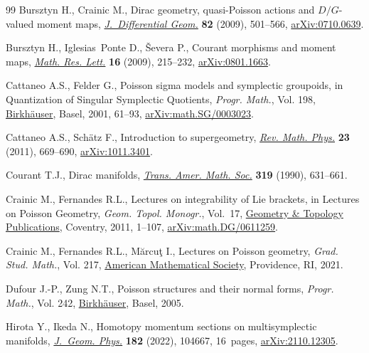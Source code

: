 \documentclass[10pt,a4paper]{amsart}
\numberwithin{equation}{section}
\begin{document}
\begin{thebibliography}{99}
Bursztyn H., Crainic M., Dirac geometry, quasi-{P}oisson actions and
 {$D/G$}-valued moment maps, \href{https://doi.org/10.4310/jdg/1251122545}{\textit{J.~Differential Geom.}} \textbf{82}
 (2009), 501--566, \href{https://arxiv.org/abs/0710.0639}{arXiv:0710.0639}.

Bursztyn H., Iglesias~Ponte D., \v{S}evera P., Courant morphisms and moment
 maps, \href{https://doi.org/10.4310/MRL.2009.v16.n2.a2}{\textit{Math. Res. Lett.}} \textbf{16} (2009), 215--232,
 \href{https://arxiv.org/abs/0801.1663}{arXiv:0801.1663}.

Cattaneo A.S., Felder G., Poisson sigma models and symplectic groupoids, in
 Quantization of {S}ingular {S}ymplectic {Q}uotients, \textit{Progr. Math.},
 Vol. 198, \href{https://doi.org/10.1007/978-3-0348-8364-1_4}{Birkh\"auser}, Basel, 2001, 61--93, \href{https://arxiv.org/abs/math.SG/0003023}{arXiv:math.SG/0003023}.

Cattaneo A.S., Sch\"atz F., Introduction to supergeometry, \href{https://doi.org/10.1142/S0129055X11004400}{\textit{Rev. Math.
 Phys.}} \textbf{23} (2011), 669--690, \href{https://arxiv.org/abs/1011.3401}{arXiv:1011.3401}.

Courant T.J., Dirac manifolds, \href{https://doi.org/10.2307/2001258}{\textit{Trans. Amer. Math. Soc.}} \textbf{319}
 (1990), 631--661.

Crainic M., Fernandes R.L., Lectures on integrability of {L}ie brackets, in
 Lectures on {P}oisson {G}eometry, \textit{Geom. Topol. Monogr.}, Vol.~17,
 \href{https://doi.org/10.2140/gt}{Geometry \& Topology Publications}, Coventry, 2011, 1--107,
 \href{https://arxiv.org/abs/math.DG/0611259}{arXiv:math.DG/0611259}.

Crainic M., Fernandes R.L., M\u{a}rcu\c{t} I., Lectures on {P}oisson geometry,
 \textit{Grad. Stud. Math.}, Vol. 217, \href{https://doi.org/10.1090/gsm/217}{American Mathematical Society},
 Providence, RI, 2021.

Dufour J.-P., Zung N.T., Poisson structures and their normal forms,
 \textit{Progr. Math.}, Vol. 242, \href{https://doi.org/10.1007/3-7643-7335-0}{Birkh\"auser}, Basel, 2005.

Hirota Y., Ikeda N., Homotopy momentum sections on multisymplectic manifolds,
 \href{https://doi.org/10.1016/j.geomphys.2022.104667}{\textit{J.~Geom. Phys.}} \textbf{182} (2022), 104667, 16~pages,
 \href{https://arxiv.org/abs/2110.12305}{arXiv:2110.12305}.


\end{thebibliography}
\end{document}
